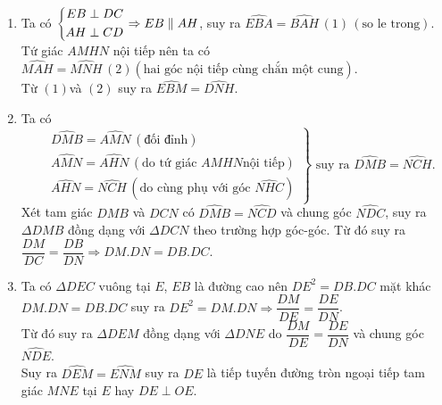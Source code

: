 \begin{bt}
{\begin{enumerate}
			\item Ta có $\left\{\begin{aligned}EB\perp DC\\ AH\perp CD\end{aligned}\right.\Rightarrow EB\parallel AH$, suy ra $\widehat{EBA}=\widehat{BAH}\, (1) \, (\mbox{so le trong}). $\\
			Tứ giác $AMHN$ nội tiếp nên ta có $\widehat{MAH}=\widehat{MNH}\, (2) (\mbox{hai góc nội tiếp cùng chắn một cung})$.\\
			Từ $(1)$và $(2)$ suy ra $\widehat{EBM}=\widehat{DNH}$.
			\item Ta có
			$$
			\left.
			\begin{aligned}
			&\widehat{DMB}=\widehat{AMN}\, (\mbox{đối đỉnh})\\
			&\widehat{AMN}=\widehat{AHN}\, (\mbox{do tứ giác } AMHN \mbox{nội tiếp})\\
			&\widehat{AHN}=\widehat{NCH}\, (\mbox{do cùng phụ với góc } \widehat{NHC})
			\end{aligned} 
			\right\} 
			\mbox{ suy ra } \widehat{DMB}=\widehat{NCH}.
			$$        
			Xét tam giác $DMB$ và $DCN$ có $\widehat{DMB}=\widehat{NCD}$ và chung góc $\widehat{NDC}$, suy ra $\Delta DMB$ đồng dạng với $\Delta DCN$ theo trường hợp góc-góc. Từ đó suy ra $\dfrac{DM}{DC}=\dfrac{DB}{DN}\Rightarrow DM.DN=DB.DC$.
			\item Ta có $\Delta DEC$ vuông tại $E$, $EB$ là đường cao nên $DE^2=DB.DC$ mặt khác $DM.DN=DB.DC$ suy ra $DE^2=DM.DN \Rightarrow \dfrac{DM}{DE}=\dfrac{DE}{DN}$.\\
			Từ đó suy ra $\Delta DEM$ đồng dạng với $\Delta DNE$ do $\dfrac{DM}{DE}=\dfrac{DE}{DN}$ và chung góc $\widehat{NDE}$.\\
			Suy ra $\widehat{DEM}=\widehat{ENM}$ suy ra $DE$ là tiếp tuyến đường tròn ngoại tiếp tam giác $MNE$ tại $E$ hay $DE\perp OE$. 
		\end{enumerate}
	}
\end{bt}

